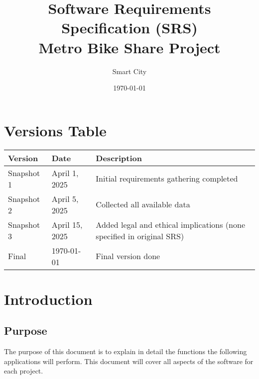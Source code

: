 \documentclass[15pt]{article}
\title{Software Requirements Specification (SRS)\\Metro Bike Share Project}
\author{Smart City}
\date{\today}
\begin{document}
\maketitle
\newpage

\tableofcontents
\newpage

\section*{Versions Table}
\begin{longtable}{|l|l|l|}
\hline
Version & Date & Description \\
\hline
Snapshot 1 & April 1, 2025 & Initial requirements gathering completed \\
\hline
Snapshot 2 & April 5, 2025 & Collected all available data \\
\hline
Snapshot 3 & April 15, 2025 & Added legal and ethical implications (none specified in original SRS) \\
\hline
Final & \today & Final version done \\
\hline
\end{longtable}


\newpage

\section{Introduction}
\subsection{Purpose}
The purpose of this document is to explain in detail the functions the following applications will perform. This document will cover all aspects of the software for each project.
\end{document}
